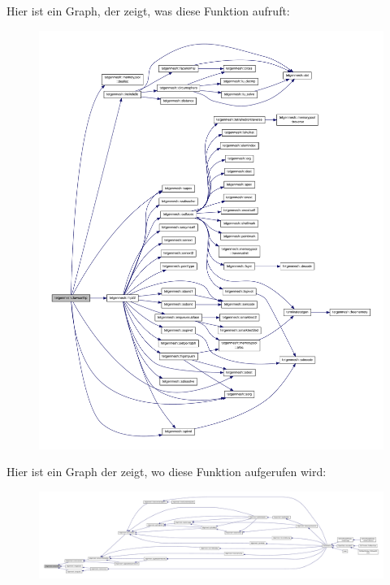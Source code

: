 Hier ist ein Graph, der zeigt, was diese Funktion aufruft\-:\nopagebreak
\begin{figure}[H]
\begin{center}
\leavevmode
\includegraphics[width=350pt]{classtetgenmesh_acf60f3a43f8b907d95623b42a88ae968_cgraph}
\end{center}
\end{figure}




Hier ist ein Graph der zeigt, wo diese Funktion aufgerufen wird\-:\nopagebreak
\begin{figure}[H]
\begin{center}
\leavevmode
\includegraphics[width=350pt]{classtetgenmesh_acf60f3a43f8b907d95623b42a88ae968_icgraph}
\end{center}
\end{figure}


